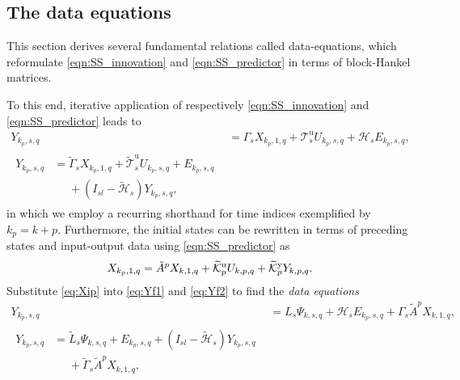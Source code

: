 % 
\subsection{The data equations}\label{sec:DerivingDataEquations}
\noindent This section derives several fundamental relations called data-equations, which reformulate \eqref{eqn:SS_innovation} and \eqref{eqn:SS_predictor} in terms of block-Hankel matrices.

To this end, iterative application of respectively \eqref{eqn:SS_innovation} and \eqref{eqn:SS_predictor} leads to%
\begin{align}
    Y_{k_p,s,q} &= \Gamma_s X_{k_p,1,q} + \mathcal{T}_s^\mathrm{u} U_{k_p,s,q} + \mathcal{H}_s E_{k_p,s,q}\label{eq:Yf1},\\
    \begin{split}%
    Y_{k_p,s,q} &= \widetilde{\Gamma}_s X_{k_p,1,q} + \widetilde{\mathcal{T}}_s^\mathrm{u} U_{k_p,s,q} + E_{k_p,s,q}\\
    &\phantom{=}+(I_{sl}-\widetilde{\mathcal{H}}_s)Y_{k_p,s,q},
    \end{split}\label{eq:Yf2}
\end{align}
in which we employ a recurring shorthand for time indices exemplified by $k_p=k+p$. Furthermore, the initial states can be rewritten in terms of preceding states and input-output data using \eqref{eqn:SS_predictor} as%
\begin{align}\label{eq:Xip}
    X_{k_p,1,q} = \tilde{A}^p X_{k,1,q} + \widetilde{\mathcal{K}}_{p}^{\mathrm{{u}}} U_{k,p,q} + \widetilde{\mathcal{K}}_{p}^{\mathrm{{y}}} Y_{k,p,q}.
\end{align}
Substitute \eqref{eq:Xip} into \eqref{eq:Yf1} and \eqref{eq:Yf2} %
to find the \textit{data equations}
\begin{align}
    Y_{k_p,s,q} &= L_s \Psi_{k,s,q} + \mathcal{H}_s E_{k_p,s,q} + \Gamma_s \tilde{A}^p X_{k,1,q},\label{eq:DataEq1}\\
    \begin{split}
    Y_{k_p,s,q} &= \widetilde{L}_s \Psi_{k,s,q} + E_{k_p,s,q} + (I_{sl}-\widetilde{\mathcal{H}}_s) Y_{k_p,s,q} \\
    &\phantom{=}+ \widetilde{\Gamma}_s \tilde{A}^p X_{k,1,q},
    \end{split}\label{eq:DataEq2}
\end{align}
